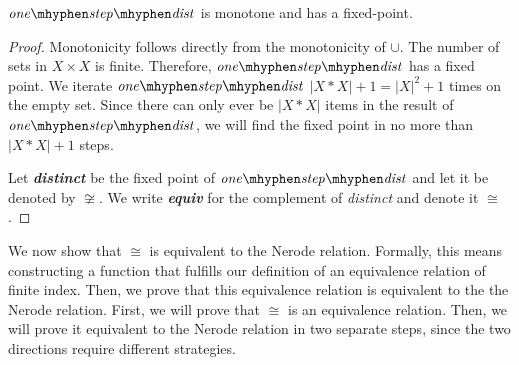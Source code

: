 \begin{lemma}
    \label{dist_monotone}
    $\mathit{one\mhyphen step\mhyphen dist}$ is monotone and has a fixed-point.
\end{lemma}
\begin{proof}
    Monotonicity follows directly from the monotonicity of $\cup$. 
    The number of sets in $X \times X$ is finite. 
    Therefore, $\mathit{one\mhyphen step\mhyphen dist}$ has a fixed point.
    We iterate $\mathit{one\mhyphen step\mhyphen dist}$ $|X*X|+1 = |X|^2+1$ times on the empty set.
    Since there can only ever be $|X*X|$ items in the result of $\mathit{one\mhyphen step\mhyphen dist}$, 
    we will find the fixed point in no more than $|X*X|+1$ steps.
    
    Let \textit{\textbf{distinct}} be the fixed point of $\mathit{one\mhyphen step\mhyphen dist}$ and let it be denoted by $\not\cong$. 
We write \textit{\textbf{equiv}} for the complement of \textit{distinct} and denote it $\cong$.
\end{proof}



We now show that $\cong$ is equivalent to the Nerode relation. 
Formally, this means constructing a function that fulfills our definition
of an equivalence relation of finite index.
Then, we prove that this equivalence relation is equivalent to the the Nerode relation.
First, we will prove that $\cong$ is an equivalence relation.
Then, we will prove it equivalent to the Nerode relation in two separate steps, 
since the two directions require different strategies.


